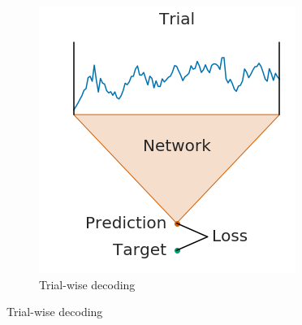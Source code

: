 \begin{figure}[!htbp]
\centering
\begin{subfigure}[a]{0.38\textwidth}
   \includegraphics[width=\linewidth]{img/ch3/trialwise-explanation}
   \caption{Trial-wise decoding}
   \label{fig:trial-wise-decoding-trial-wise}
\end{subfigure}


\end{figure}
